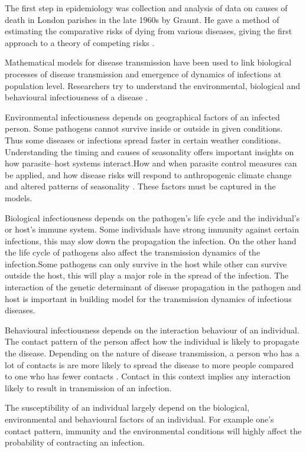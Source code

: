  The first step in epidemiology was collection and analysis of data on causes of death in London parishes in the late 1960s by Graunt. He  gave a method of estimating the comparative risks of dying from various diseases, giving the first approach to a theory of competing risks \citep{Brauer2017}.
 
 Mathematical models for disease transmission have been used to link biological processes of disease transmission and emergence of dynamics of infections at  population level. Researchers try to understand the environmental, biological  and behavioural infectiousness of a disease .
 
  Environmental infectiousness depends on geographical factors of an infected person. Some pathogens cannot survive inside or outside in given conditions. Thus some diseases or infections spread faster in certain weather conditions\citep{grass}. Understanding the timing and causes of seasonality offers important insights on how parasite–host systems interact.How and when parasite control measures can be applied, and how disease risks will respond to anthropogenic climate change and altered patterns of seasonality \citep{altizer}. These factors must be captured in the models.
  
  Biological infectiousness depends on the pathogen's life cycle and the individual's or host's immune system. Some individuals have strong immunity against certain infections, this may  slow down the propagation the infection. On the other hand the life cycle of  pathogens also affect the transmission dynamics of the infection.Some pathogens can only survive in the host while other can survive outside the host, this will play a major role in the spread of the infection.  The interaction of the genetic determinant of disease propagation in the pathogen and host is important in building model for the transmission dynamics of infectious diseases.
  
Behavioural infectiousness depends on the interaction behaviour of an individual. The contact pattern of the person affect how the individual is likely to propagate   the disease. Depending on the nature of disease transmission, a person who has  a lot of contacts is are more likely to spread the disease to more people compared to one who has fewer contacts \citep{johnson2001sexual}. Contact in this context implies any interaction likely to result in transmission of an infection.

The susceptibility of an individual largely depend on the biological, environmental and behavioural factors of an individual. For example one's contact pattern, immunity and the environmental conditions will highly affect the probability of contracting an infection.

